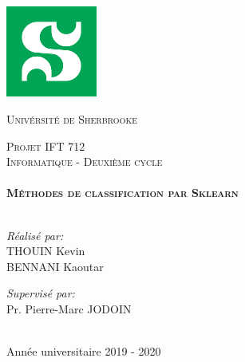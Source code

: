 \begin{titlepage}
    \begin{center}
        \includegraphics[width=3cm, height=3cm, keepaspectratio]{udes.png}
        \centering
        \vspace*{.06 \textheight}
        
        
        {
            \scshape \LARGE{\color{mdtRed}Univérsité de Sherbrooke} \par
        }
        \vspace{1.5cm}
        
        \textsc {
            \Large Projet IFT 712 \\
            \vspace{0.2cm}
            Informatique - Deuxième cycle
        } \\ [1cm]
        
        \HRule \\ [0.4cm]
        {
            \huge \bfseries \textsc{{Méthodes de classification par Sklearn\\}}
        }
        \vspace{0.4cm}
        \HRule \\ [1.5cm]
         
        
        \begin{minipage}[t]{0.4\textwidth}
            \begin{flushleft} 
                \large \emph {Réalisé par:} \\
                \vspace{0.05cm}
                { \color{mdtRed}
                    {\textsc{THOUIN} Kevin } \\    
                    {\textsc{BENNANI} Kaoutar} \\
                }
            \end{flushleft}
        \end{minipage}
        \begin{minipage}[t]{0.4\textwidth}
            \begin{flushright} \large
                \emph{Supervisé par:} \\
                {\color{mdtRed} Pr. Pierre-Marc JODOIN}\\
            \end{flushright}
        \end{minipage}\\[4cm]
        
        {\large Année universitaire 2019 - 2020}\\[4cm]
         
        \vfill
    \end{center}
\end{titlepage}
\clearpage
